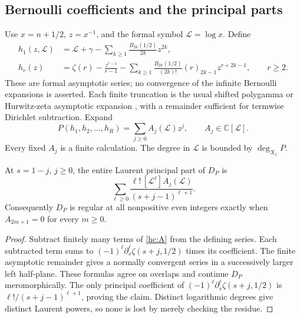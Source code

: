\subsection{Bernoulli coefficients and the principal parts}

Use $x=n+1/2$, $z=x^{-1}$, and the formal symbol $\mathcal L=\log x$. Define
\begin{align}
 h_1(z,\mathcal L)&=\mathcal L+\gamma-
           \sum_{k\ge1}\frac{B_{2k}(1/2)}{2k}z^{2k},\label{hc:h1}\\
 h_r(z)&=\zeta(r)-\frac{z^{r-1}}{r-1}
  -\sum_{k\ge1}\frac{B_{2k}(1/2)}{(2k)!}(r)_{2k-1}
                         z^{r+2k-1},\qquad r\ge2.\label{hc:hr}
\end{align}
These are formal asymptotic series; no convergence of the infinite
Bernoulli expansions is asserted. Each finite truncation is the
usual shifted polygamma or Hurwitz-zeta asymptotic expansion \cite{DLMFGamma,DLMFHurwitz}, with
a remainder sufficient for termwise Dirichlet subtraction.
Expand
\begin{equation}\label{hc:A}
 P(h_1,h_2,\ldots,h_R)=\sum_{j\ge0}A_j(\mathcal L)z^j,
             \qquad A_j\in\mathbb C[\mathcal L].
\end{equation}
Every fixed $A_j$ is a finite calculation. The degree in $\mathcal L$ is
bounded by $\deg_{X_1}P$.

\begin{proposition}
\label{hc:principal}
At $s=1-j$, $j\ge0$, the entire Laurent principal part of $D_P$ is
\begin{equation}\label{hc:principal-formula}
 \sum_{\ell\ge0}
 \frac{\ell!\,[\mathcal L^\ell]A_j(\mathcal L)}{(s+j-1)^{\ell+1}}.
\end{equation}
Consequently $D_P$ is regular at all nonpositive even integers
exactly when $A_{2m+1}=0$ for every $m\ge0$.
\end{proposition}
\begin{proof}
Subtract finitely many terms of \eqref{hc:A} from the defining
series. Each subtracted term sums to
$(-1)^\ell\partial_s^\ell\zeta(s+j,1/2)$ times its coefficient.
The finite asymptotic remainder gives a normally convergent series
in a successively larger left half-plane. These formulas agree on
overlaps and continue $D_P$ meromorphically. The only principal
coefficient of $(-1)^\ell\partial_s^\ell\zeta(s+j,1/2)$ is
$\ell!/(s+j-1)^{\ell+1}$, proving the claim. Distinct logarithmic
degrees give distinct Laurent powers, so none is lost by merely
checking the residue.
\end{proof}

